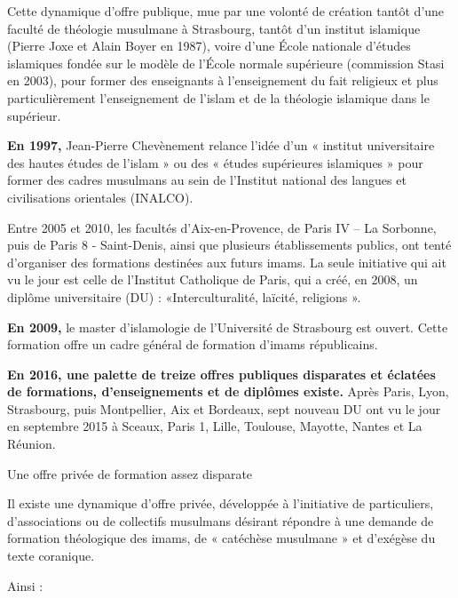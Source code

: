 Cette dynamique d'offre publique, mue par une volonté de création tantôt
d'une faculté de théologie musulmane à Strasbourg, tantôt d'un institut
islamique (Pierre Joxe et Alain Boyer en 1987), voire d'une École
nationale d'études islamiques fondée sur le modèle de l'École normale
supérieure (commission Stasi en 2003), pour former des enseignants à
l'enseignement du fait religieux et plus particulièrement l'enseignement
de l'islam et de la théologie islamique dans le supérieur.

\textbf{En 1997,} Jean-Pierre Chevènement relance l'idée d'un « institut
universitaire des hautes études de l'islam » ou des « études supérieures
islamiques » pour former des cadres musulmans au sein de l'Institut
national des langues et civilisations orientales (INALCO).

Entre 2005 et 2010, les facultés d'Aix-en-Provence, de Paris IV -- La
Sorbonne, puis de Paris 8 - Saint-Denis, ainsi que plusieurs
établissements publics, ont
tenté d'organiser des formations destinées aux futurs imams. La seule
initiative qui ait vu le jour est celle de l'Institut Catholique de
Paris, qui a créé, en 2008, un diplôme universitaire (DU) :
«Interculturalité, laïcité, religions ».

\textbf{En 2009,} le master d'islamologie de l'Université de Strasbourg
est ouvert. Cette formation offre un cadre général de formation d'imams
républicains.

\textbf{En 2016, une palette de treize offres publiques disparates et
éclatées de formations, d'enseignements et de diplômes existe.} Après
Paris, Lyon, Strasbourg, puis Montpellier, Aix et Bordeaux, sept nouveau
DU ont vu le jour en septembre 2015 à Sceaux, Paris 1, Lille, Toulouse,
Mayotte, Nantes et La Réunion.


Une offre privée de formation assez disparate


Il existe une dynamique d'offre privée, développée à l'initiative de
particuliers, d'associations ou de collectifs musulmans désirant
répondre à une demande de formation théologique des imams, de «
catéchèse musulmane » et d'exégèse du texte coranique.

Ainsi :


